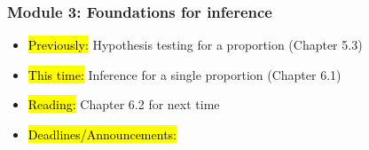 
\begin{frame}
    \frametitle{Module 3: Foundations for inference}
    \begin{itemize}
        \item \hl{Previously: }Hypothesis testing for a proportion (Chapter 5.3)
        \item \hl{This time: }Inference for a single proportion (Chapter 6.1)
        \item \hl{Reading: }Chapter 6.2 for next time
        \item \hl{Deadlines/Announcements: }
    \end{itemize}
    
\end{frame}